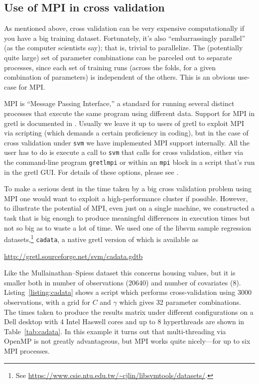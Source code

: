 \documentclass{article}
\begin{document}
\subsection{Use of MPI in cross validation}
\label{sec:mpi}

As mentioned above, cross validation can be very expensive
computationally if you have a big training dataset. Fortunately, it's
also ``embarrassingly parallel'' (as the computer scientists say);
that is, trivial to parallelize. The (potentially quite large) set of
parameter combinations can be parceled out to separate processes,
since each set of training runs (across the folds, for a given
combination of parameters) is independent of the others. This is an
obvious use-case for MPI.

MPI is ``Message Passing Interface,'' a standard for running several
distinct processes that execute the same program using different
data. Support for MPI in gretl is documented in
\cite{gretl-mpi}. Usually we leave it up to users of gretl to exploit
MPI via scripting (which demands a certain proficiency in coding), but
in the case of cross validation under \texttt{svm} we have implemented
MPI support internally. All the user has to do is execute a call to
\texttt{svm} that calls for cross validation, either via the
command-line program \texttt{gretlmpi} or within an \texttt{mpi} block
in a script that's run in the gretl GUI. For details of these options,
please see \cite{gretl-mpi}.

To make a serious dent in the time taken by a big cross validation
problem using MPI one would want to exploit a high-performance cluster
if possible. However, to illustrate the potential of MPI, even just on
a single machine, we constructed a task that is big enough to produce
meaningful differences in execution times but not so big as to waste a
lot of time. We used one of the \textsf{libsvm} sample regression
datasets,\footnote{See
  \url{https://www.csie.ntu.edu.tw/~cjlin/libsvmtools/datasets/}.}
\texttt{cadata}, a native gretl version of which is available as

\url{http://gretl.sourceforge.net/svm/cadata.gdtb}

Like the Mullainathan--Spiess dataset this concerns housing values,
but it is smaller both in number of observations (20640) and number of
covariates (8).  Listing~\ref{listing:cadata} shows a script which
performs cross-validation using 3000 observations, with a grid for $C$
and $\gamma$ which gives 32 parameter combinations. The times taken to
produce the results matrix under different configurations on a Dell
desktop with 4 Intel Haswell cores and up to 8 hyperthreads are shown
in Table~\ref{tab:cadata}. In this example it turns out that
multi-threading via \textsf{OpenMP} is not greatly advantageous, but
MPI works quite nicely---for up to six MPI processes.
\end{document}
